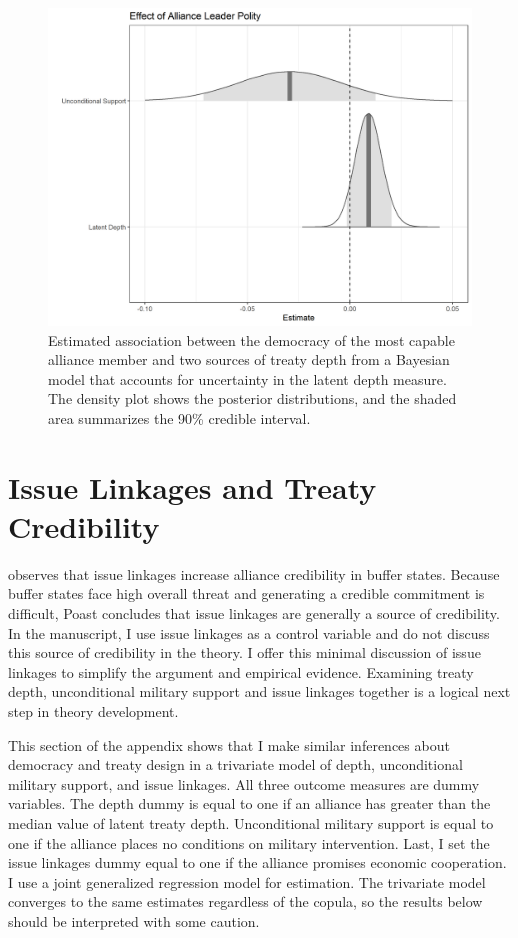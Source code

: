 \documentclass[12pt]{article}
\begin{document}
\begin{figure}
\includegraphics[width=.95\textwidth]{results-unc-depth.png}  
\caption{Estimated association between the democracy of the most capable alliance member and two sources of treaty depth from a Bayesian model that accounts for uncertainty in the latent depth measure. The density plot shows the posterior distributions, and the shaded area summarizes the 90\% credible interval.}
\label{fig:results-unc-depth}
\end{figure}


\section{Issue Linkages and Treaty Credibility}


\citep{Poast2013} observes that issue linkages increase alliance credibility in buffer states.
Because buffer states face high overall threat and generating a credible commitment is difficult, Poast concludes that issue linkages are generally a source of credibility.
In the manuscript, I use issue linkages as a control variable and do not discuss this source of credibility in the theory. 
I offer this minimal discussion of issue linkages to simplify the argument and empirical evidence. 
Examining treaty depth, unconditional military support and issue linkages together is a logical next step in theory development. 


This section of the appendix shows that I make similar inferences about democracy and treaty design in a trivariate model of depth, unconditional military support, and issue linkages. 
All three outcome measures are dummy variables. 
The depth dummy is equal to one if an alliance has greater than the median value of latent treaty depth. 
Unconditional military support is equal to one if the alliance places no conditions on military intervention. 
Last, I set the issue linkages dummy equal to one if the alliance promises economic cooperation. 
I use a joint generalized regression model for estimation. 
The trivariate model converges to the same estimates regardless of the copula, so the results below should be interpreted with some caution.
\end{document}
